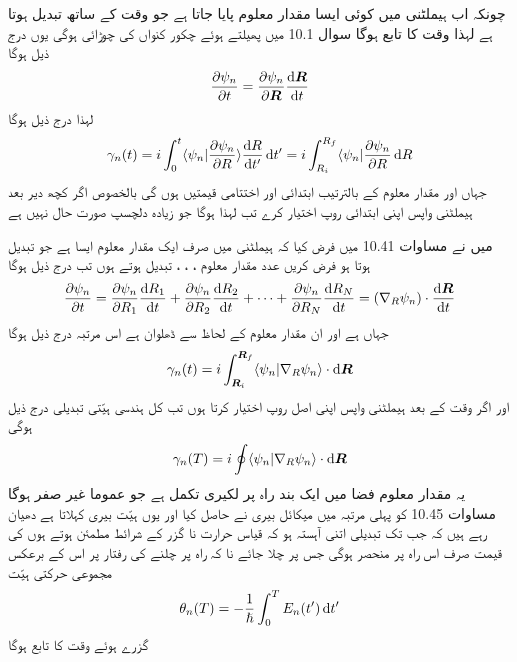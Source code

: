  چونکہ اب ہيملٹنی میں کوئی ایسا مقدار معلوم  پایا جاتا ہے جو وقت کے ساتھ تبدیل ہوتا ہے لہذا  وقت  کا تابع ہوگا سوال 10.1 میں پھیلتے ہوئے چکور کنواں کی چوڑائی  ہوگی یوں درج ذیل ہوگا 
\begin{align}
\frac{\partial \psi_n}{\partial t} = \frac{\partial \psi_n}{\partial \kvec{R}} \frac{\dif \kvec{R}}{\dif t}
\end{align}
لہذا درج ذیل ہوگا 
\begin{align}
\gamma_n (t) = i \int_0^t \langle \psi_n | \frac{\partial \psi_n}{\partial R} \rangle \frac{\dif R}{\dif t'} \dif t' = i \int_{R_i}^{R_f} \langle \psi_n | \frac{\partial \psi_n}{\partial R} \dif R 
\end{align}
جہاں  اور  مقدار معلوم  کے بالترتیب ابتدائی اور اختتامی قیمتیں ہوں گی بالخصوص اگر کچھ دیر  بعد ہیملٹنی واپس اپنی ابتدائی روپ اختیار کرے تب  لہذا  ہوگا جو زیادہ دلچسپ صورت حال نہیں ہے

 میں نے مساوات 10.41 میں فرض کیا کہ ہيملٹنی میں صرف ایک مقدار معلوم ایسا ہے جو تبدیل ہوتا ہو فرض کریں  عدد مقدار معلوم ،  ، ،  تبدیل ہوتے ہوں تب درج ذیل ہوگا 
\begin{align}
\frac{\partial \psi_n}{\partial t} = \frac{\partial \psi_n}{\partial R_1} \frac{\dif R_1}{\dif t} + \frac{\partial \psi_n}{\partial R_2} \frac{\dif R_2}{\dif t} + \cdots + \frac{\partial \psi_n}{\partial R_N} \frac{\dif R_N}{\dif t} = (\nabla_R \psi_n) \cdot \frac{\dif \kvec{R}}{\dif t}
\end{align} 
جہاں  ہے اور  ان مقدار معلوم کے لحاظ سے ڈھلوان ہے اس مرتبہ درج ذیل ہوگا 
\begin{align}
\gamma_n (t) = i \int_{\kvec{R}_i}^{\kvec{R}_f} \langle \psi_n | \nabla_R \psi_n \rangle \cdot \dif \kvec{R}
\end{align}
اور اگر وقت  کے بعد ہیملٹنی واپس اپنی اصل روپ اختیار کرتا ہوں تب کل ہندسى ہیّتی تبدیلی درج ذیل ہوگی 
\begin{align}
\gamma_n (T) = i \oint \langle \psi_n | \nabla_R \psi_n \rangle \cdot \dif \kvec{R}
\end{align}
یہ مقدار معلوم فضا میں ایک بند راہ پر لکیری تکمل ہے جو عموما غیر صفر ہوگا مساوات 10.45 کو پہلی مرتبہ    میں میکائل بیری نے حاصل کیا اور یوں  ہیّت بیری کہلاتا ہے دھیان رہے ہیں کہ جب تک تبدیلی اتنی آہستہ ہو کہ قیاس حرارت نا گزر کے شرائط مطمئن ہوتے ہوں  کی قیمت صرف اس راہ پر منحصر ہوگی جس پر چلا جائے نا کہ راہ پر چلنے کی رفتار پر اس کے برعکس مجموعی حرکتی ہیّت 
\begin{align*}
\theta_n (T) = - \frac{1}{\hslash} \int_0^T E_n (t') \dif t'
\end{align*}
گزرے ہوئے وقت کا تابع ہوگا

